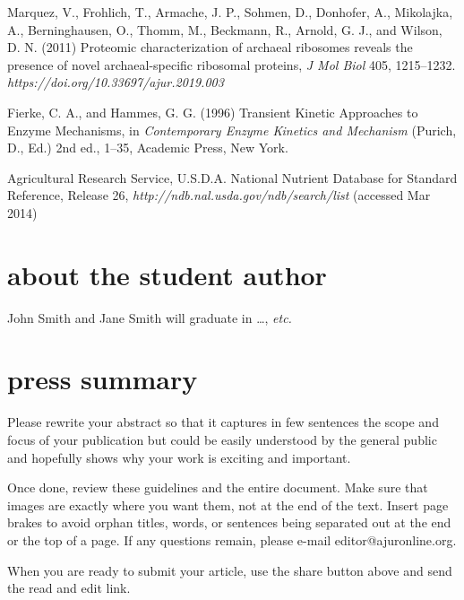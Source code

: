 \documentclass[10pt]{article}
\begin{document}
\begin{thebibliography}{9} %

 Marquez, V., Frohlich, T., Armache, J. P., Sohmen, D., Donhofer, A., Mikolajka, A., Berninghausen, O., Thomm, M., Beckmann, R., Arnold, G. J., and Wilson, D. N. (2011) Proteomic characterization of archaeal ribosomes reveals the presence of novel archaeal-specific ribosomal proteins, \textit{J Mol Biol} 405, 1215--1232. \textit {https://doi.org/10.33697/ajur.2019.003}


 Fierke, C. A., and Hammes, G. G. (1996) Transient Kinetic Approaches to Enzyme Mechanisms, in \textit{Contemporary Enzyme Kinetics and Mechanism} (Purich, D., Ed.) 2nd ed., 1--35, Academic Press, New York.

 Agricultural Research Service, U.S.D.A. National Nutrient Database for Standard Reference, Release 26, \textit{http://ndb.nal.usda.gov/ndb/search/list} (accessed Mar 2014)
\end{thebibliography}

\section*{about the student author}
John Smith and Jane Smith will graduate in \ldots, \textit{etc.}

\section*{press summary}

Please rewrite your abstract so that it captures in few sentences the scope and focus of your publication but could be easily understood by the general public and hopefully shows why your work is exciting and important.

Once done, review these guidelines and the entire document. Make sure that images are exactly where you want them, not at the end of the text. Insert page brakes to avoid orphan titles, words, or sentences being separated out at the end or the top of a page. If any questions remain, please e-mail editor@ajuronline.org.

When you are ready to submit your article, use the share button above and send the read and edit  link.
\end{document}
